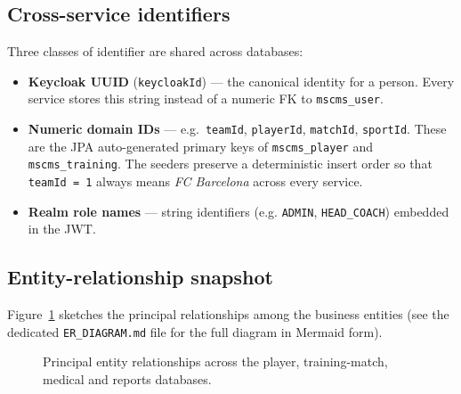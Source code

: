 \documentclass[12pt,a4paper,oneside]{report}
\begin{document}
\subsection{Cross-service identifiers}
Three classes of identifier are shared across databases:
\begin{itemize}[leftmargin=*]
  \item \textbf{Keycloak UUID} (\texttt{keycloakId}) --- the canonical
        identity for a person. Every service stores this string instead of
        a numeric FK to \texttt{mscms\_user}.
  \item \textbf{Numeric domain IDs} --- e.g.\ \texttt{teamId},
        \texttt{playerId}, \texttt{matchId}, \texttt{sportId}. These are
        the JPA auto-generated primary keys of \texttt{mscms\_player} and
        \texttt{mscms\_training}. The seeders preserve a deterministic
        insert order so that \texttt{teamId = 1} always means
        \emph{FC Barcelona} across every service.
  \item \textbf{Realm role names} --- string identifiers (e.g.
        \texttt{ADMIN}, \texttt{HEAD\_COACH}) embedded in the JWT.
\end{itemize}

\subsection{Entity-relationship snapshot}
Figure~\ref{fig:er} sketches the principal relationships among the
business entities (see the dedicated \texttt{ER\_DIAGRAM.md} file for the
full diagram in Mermaid form).

\begin{figure}[ht]
\centering
{}
\caption{Principal entity relationships across the player, training-match,
         medical and reports databases.}
\label{fig:er}
\end{figure}
\end{document}
